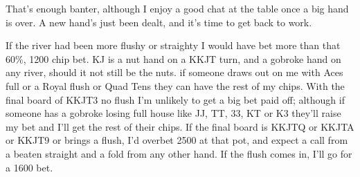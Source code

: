 That's enough banter, although I enjoy a good chat at the table
once a big hand is over. A new hand's just been dealt, and
it's time to get back to work.

If the river had been more flushy or straighty I would have bet more
than that 60\%, 1200 chip bet. KJ is a nut hand on a KKJT turn, and a
gobroke hand on any river, should it not still be the nuts.
if someone draws out on me with Aces full or a Royal flush or Quad
Tens they can have the rest of my chips. With the final board of KKJT3
no flush I'm unlikely to get a big bet paid off; although if someone
has a gobroke losing full house like JJ, TT, 33, KT or K3 they'll
raise my bet and I'll get the rest of their chips. If the final board
is KKJTQ or KKJTA or KKJT9 or brings a flush, I'd overbet 2500 at that
pot, and expect a call from a beaten straight and a fold from any
other hand. If the flush comes in, I'll go for a 1600 bet.


